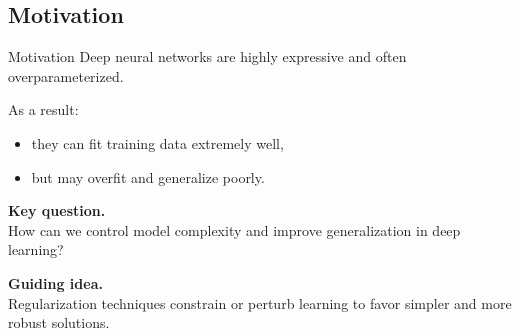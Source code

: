 \documentclass[aspectratio=169,11pt]{beamer}
\begin{document}
\subsection{Motivation}
\begin{frame}[t,allowframebreaks]{Motivation}
\small
Deep neural networks are highly expressive and often overparameterized.

As a result:
\begin{itemize}
    \item they can fit training data extremely well,
    \item but may overfit and generalize poorly.
\end{itemize}

\textbf{Key question.}\\ How can we control model complexity and improve generalization in deep learning?

\textbf{Guiding idea.}\\ Regularization techniques constrain or perturb learning to favor simpler and more robust solutions.
\end{frame}
\end{document}
